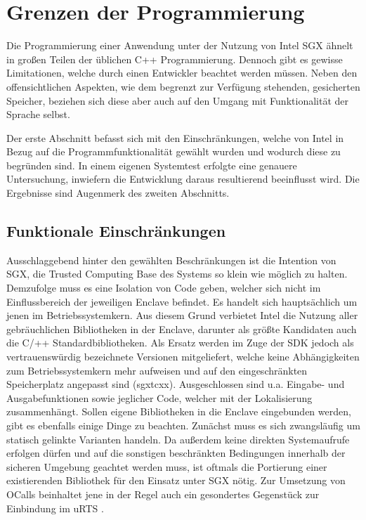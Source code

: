 \section{Grenzen der Programmierung}

Die Programmierung einer Anwendung unter der Nutzung von Intel \ac{SGX} ähnelt in großen Teilen der üblichen C++ Programmierung. Dennoch gibt es gewisse Limitationen, welche durch einen Entwickler beachtet werden müssen. Neben den offensichtlichen Aspekten, wie dem begrenzt zur Verfügung stehenden, gesicherten Speicher, beziehen sich diese aber auch auf den Umgang mit Funktionalität der Sprache selbst. 

Der erste Abschnitt befasst sich mit den Einschränkungen, welche von Intel in Bezug auf die Programmfunktionalität gewählt wurden und wodurch diese zu begründen sind. In einem eigenen Systemtest erfolgte eine genauere Untersuchung, inwiefern die Entwicklung daraus resultierend beeinflusst wird. Die Ergebnisse sind Augenmerk des zweiten Abschnitts.

\subsection{Funktionale Einschränkungen}

Ausschlaggebend hinter den gewählten Beschränkungen ist die Intention von \ac{SGX}, die Trusted Computing Base des Systems so klein wie möglich zu halten. Demzufolge muss es eine Isolation von Code geben, welcher sich nicht im Einflussbereich der jeweiligen Enclave befindet. Es handelt sich hauptsächlich um jenen im Betriebssystemkern. Aus diesem Grund verbietet Intel die Nutzung aller gebräuchlichen Bibliotheken in der Enclave, darunter als größte Kandidaten auch die C/++ Standardbibliotheken. Als Ersatz werden im Zuge der \ac{SDK} jedoch als vertrauenswürdig bezeichnete Versionen mitgeliefert, welche keine Abhängigkeiten zum Betriebssystemkern mehr aufweisen und auf den eingeschränkten Speicherplatz angepasst sind (sgx\textunderscore tcxx). Ausgeschlossen sind u.a. Eingabe- und Ausgabefunktionen sowie jeglicher Code, welcher mit der Lokalisierung zusammenhängt. Sollen eigene Bibliotheken in die Enclave eingebunden werden, gibt es ebenfalls einige Dinge zu beachten. Zunächst muss es sich zwangsläufig um statisch gelinkte Varianten handeln. Da außerdem keine direkten Systemaufrufe erfolgen dürfen und auf die sonstigen beschränkten Bedingungen innerhalb der sicheren Umgebung geachtet werden muss, ist oftmals die Portierung einer existierenden Bibliothek für den Einsatz unter \ac{SGX} nötig. Zur Umsetzung von \acp{OCall} beinhaltet jene in der Regel auch ein gesondertes Gegenstück zur Einbindung im \ac{uRTS} \cite{LinuxGuide}.
 
